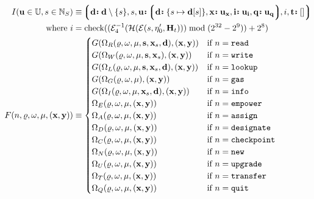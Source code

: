 \begin{align}
  I(\mathbf{u} \in \mathbb{U}, s \in \N_S) &\equiv \tup{
    \is{\mathbf{d}}{\mathbf{d} \setminus \{ s \}},
    s,
    \is{\mathbf{u}}{\tuple{\is{\mathbf{d}}{\{s \mapsto \mathbf{d}[s]\}}, \is{\mathbf{x}}{\mathbf{u}_\mathbf{x}}, \is{\mathbf{i}}{\mathbf{u}_\mathbf{i}}, \is{\mathbf{q}}{\mathbf{u}_\mathbf{q}}}},
    i,
    \is{\mathbf{t}}{[]}
  }\\
  \where i &= \text{check}((\de_4(\mathcal{H}(\se(s, \eta'_0, \mathbf{H}_t))) \bmod (2^{32}-2^9)) + 2^8) \\
  F(n, \gascounter, \registers, \memory, (\mathbf{x}, \mathbf{y})) &\equiv \begin{cases}
    G(\Omega_R(\gascounter, \registers, \memory, \mathbf{s}, \mathbf{x}_s, \mathbf{d}), (\mathbf{x}, \mathbf{y})) &\when n = \mathtt{read} \\
    G(\Omega_W(\gascounter, \registers, \memory, \mathbf{s}, \mathbf{x}_s), (\mathbf{x}, \mathbf{y})) &\when n = \mathtt{write} \\
    G(\Omega_L(\gascounter, \registers, \memory, \mathbf{s}, \mathbf{x}_s, \mathbf{d}), (\mathbf{x}, \mathbf{y})) &\when n = \mathtt{lookup} \\
    G(\Omega_G(\gascounter, \registers, \memory), (\mathbf{x}, \mathbf{y})) &\when n = \mathtt{gas} \\
    G(\Omega_I(\gascounter, \registers, \memory, \mathbf{x}_s, \mathbf{d}), (\mathbf{x}, \mathbf{y})) &\when n = \mathtt{info} \\
    \Omega_E(\gascounter, \registers, \memory, (\mathbf{x}, \mathbf{y})) &\when n = \mathtt{empower}\\
    \Omega_A(\gascounter, \registers, \memory, (\mathbf{x}, \mathbf{y})) &\when n = \mathtt{assign}\\
    \Omega_D(\gascounter, \registers, \memory, (\mathbf{x}, \mathbf{y})) &\when n = \mathtt{designate}\\
    \Omega_C(\gascounter, \registers, \memory, (\mathbf{x}, \mathbf{y})) &\when n = \mathtt{checkpoint} \\
    \Omega_N(\gascounter, \registers, \memory, (\mathbf{x}, \mathbf{y})) &\when n = \mathtt{new} \\
    \Omega_U(\gascounter, \registers, \memory, (\mathbf{x}, \mathbf{y})) &\when n = \mathtt{upgrade} \\
    \Omega_T(\gascounter, \registers, \memory, (\mathbf{x}, \mathbf{y})) &\when n = \mathtt{transfer} \\
    \Omega_Q(\gascounter, \registers, \memory, (\mathbf{x}, \mathbf{y})) &\when n = \mathtt{quit} \\

\end{cases}
\end{align}

